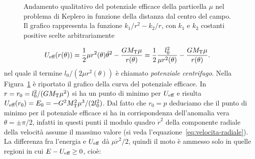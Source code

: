 {\begin{figure}
  \caption[Andamento del potenziale efficace in funzione della distanza dal
  centro del campo]{Andamento qualitativo del potenziale efficace della
    particella $\mu$ nel problema di Keplero in funzione della distanza dal
    centro del campo. Il grafico rappresenta la funzione $k_1/r^2-k_2/r$, con
    $k_1$ e $k_2$ costanti positive scelte arbitrariamente}
  \label{fig:potenziale-efficace}
\end{figure}
\begin{equation}
  U_\textup{eff}(r(\theta)) = \frac{1}{2}\mu r^2(\theta)\dot{\theta}^2 -
  \frac{GM_\textup{T}\mu}{r(\theta)} = \frac{1}{2}\frac{l_0^2}{\mu r^2(\theta)} -
  \frac{GM_\textup{T}\mu}{r(\theta)}.
\end{equation}
nel quale il termine $l_0/(2\mu r^2(\theta))$ è chiamato \emph{potenziale
  centrifugo}. Nella Figura~\ref{fig:potenziale-efficace} è riportato il grafico
della curva del potenziale efficace. In $r=r_0=l_0^2/(GM_\textup{T}\mu^2)$ si ha
un punto di minimo per $U_\textup{eff}$ e risulta $U_\textup{eff}(r_0) = E_0
=-G^2M_\textup{T}^2\mu^3/(2l_0^2)$. Dal fatto che $r_0 = p$ deduciamo che il
punto di minimo per il potenziale efficace si ha in corrispondenza dell'anomalia
vera $\theta = \pm \pi/2$, infatti in questi punti il modulo quadro $\dot{r}^2$
della componente radiale della velocità assume il massimo valore (si veda
l'equazione~\eqref{eq:velocita-radiale}). La differenza fra l'energia e
$U_\textup{eff}$ dà $\mu\dot{r}^2/2$, quindi il moto è ammesso solo in quelle
regioni in cui $E-U_\textup{eff}\geq 0$, cioè:
}
